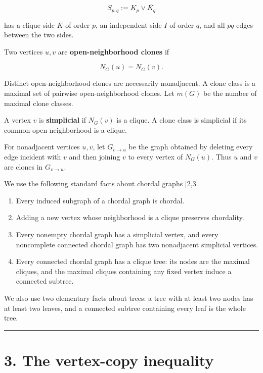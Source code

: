 \documentclass[
  11pt,
]{article}
\providecommand{\tightlist}{%
  \setlength{\itemsep}{0pt}\setlength{\parskip}{0pt}}
\begin{document}
\[
S_{p,q}:=K_p\vee\overline{K_q}
\]

has a clique side \(K\) of order \(p\), an independent side \(I\) of
order \(q\), and all \(pq\) edges between the two sides.

Two vertices \(u,v\) are \textbf{open-neighborhood clones} if

\[
N_G(u)=N_G(v).
\]

Distinct open-neighborhood clones are necessarily nonadjacent. A clone
class is a maximal set of pairwise open-neighborhood clones. Let
\(m(G)\) be the number of maximal clone classes.

A vertex \(v\) is \textbf{simplicial} if \(N_G(v)\) is a clique. A clone
class is simplicial if its common open neighborhood is a clique.

For nonadjacent vertices \(u,v\), let \(G_{v\to u}\) be the graph
obtained by deleting every edge incident with \(v\) and then joining
\(v\) to every vertex of \(N_G(u)\). Thus \(u\) and \(v\) are clones in
\(G_{v\to u}\).

We use the following standard facts about chordal graphs {[}2,3{]}.

\begin{enumerate}
\def\labelenumi{\arabic{enumi}.}
\tightlist
\item
  Every induced subgraph of a chordal graph is chordal.
\item
  Adding a new vertex whose neighborhood is a clique preserves
  chordality.
\item
  Every nonempty chordal graph has a simplicial vertex, and every
  noncomplete connected chordal graph has two nonadjacent simplicial
  vertices.
\item
  Every connected chordal graph has a clique tree: its nodes are the
  maximal cliques, and the maximal cliques containing any fixed vertex
  induce a connected subtree.
\end{enumerate}

We also use two elementary facts about trees: a tree with at least two
nodes has at least two leaves, and a connected subtree containing every
leaf is the whole tree.

\begin{center}\rule{0.5\linewidth}{0.5pt}\end{center}

\section{3. The vertex-copy
inequality}\label{the-vertex-copy-inequality}
\end{document}
